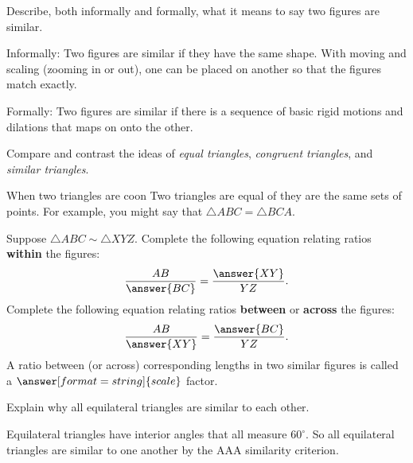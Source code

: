 \documentclass[nooutcomes]{ximera}
\begin{document}
\begin{question}
Describe, both informally and formally, what it means to say two figures are similar.
\begin{freeResponse}
\begin{hint}
Informally:  Two figures are similar if they have the same shape.  With moving and scaling (zooming in or out), one can be placed on another so that the figures match exactly.    

Formally:  Two figures are similar if there is a sequence of basic rigid motions and dilations that maps on onto the other.  
\end{hint}
\end{freeResponse}
\end{question}


\begin{question}
Compare and contrast the ideas of \textit{equal triangles},
  \textit{congruent triangles}, and \textit{similar triangles}.
\begin{freeResponse}
\begin{hint}
When two triangles are coon
Two triangles are equal of they are the same sets of points.  For example, you might say that $\triangle ABC = \triangle BCA$.  
\end{hint}
\end{freeResponse}
\end{question}

\begin{question}
Suppose $\triangle ABC \sim \triangle XYZ$.  Complete the following equation relating ratios \textbf{within} the figures: 
\[
\frac{AB}{\answer{BC}} = \frac{\answer{XY}}{YZ}.  
\]
Complete the following equation relating ratios \textbf{between} or \textbf{across} the figures: 
\[
\frac{AB}{\answer{XY}} = \frac{\answer{BC}}{YZ}.  
\]
A ratio between (or across) corresponding lengths in two similar figures is called a $\answer[format=string]{scale}$ factor.  
\end{question}


\begin{question}
Explain why all equilateral triangles are similar to each other.
\begin{freeResponse}
\begin{hint}
Equilateral triangles have interior angles that all measure $60^\circ$.  So all equilateral triangles are similar to one another by the AAA similarity criterion.  
\end{hint}
\end{freeResponse}
\end{question}
\end{document}
